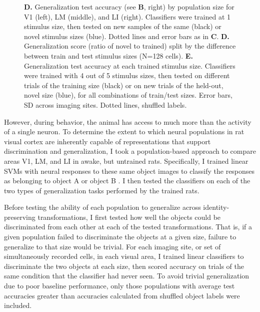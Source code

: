 \begin{figure}[t!]
{    \textbf{D.} Generalization test accuracy (see \textbf{B}, right) by population size for V1 (left), LM (middle), and LI (right). Classifiers were trained at 1 stimulus size, then tested on new samples of the same (black) or novel stimulus sizes (blue). Dotted lines and error bars as in \textbf{C}.
    \textbf{D.} Generalization score (ratio of novel to trained) split by the difference between train and test stimulus sizes (N=128 cells).
    \textbf{E.} Generalization test accuracy at each trained stimulus size. Classifiers were trained with 4 out of 5 stimulus sizes, then tested on different trials of the training size (black) or on new trials of the held-out, novel size (blue), for all combinations of train/test sizes. Error bars, SD across imaging sites. Dotted lines, shuffled labels.
    \label{fig:neural_generalization}}
\end{figure}


However, during behavior, the animal has access to much more than the activity of a single neuron. To determine the extent to which neural populations in rat visual cortex are inherently capable of representations that support discrimination and generalization, I took a population-based approach to compare areas V1, LM, and LI in awake, but untrained rats. Specifically, I trained linear SVMs with neural responses to these same object images to classify the responses as belonging to object A or object B \cite{Hung2005, Li2009, Rust2010SelectivityIT}. I then tested the classifiers on each of the two types of generalization tasks performed by the trained rats. 

Before testing the ability of each population to generalize across identity-preserving transformations, I first tested how well the objects could be discriminated from each other at each of the tested transformations. That is, if a given population failed to discriminate the objects at a given size, failure to generalize to that size would be trivial. For each imaging site, or set of simultaneously recorded cells, in each visual area, I trained linear classifiers to discriminate the two objects at each size, then scored accuracy on trials of the same condition that the classifier had never seen. To avoid trivial generalization due to poor baseline performance, only those populations with average test accuracies greater than accuracies calculated from shuffled object labels were included. 

